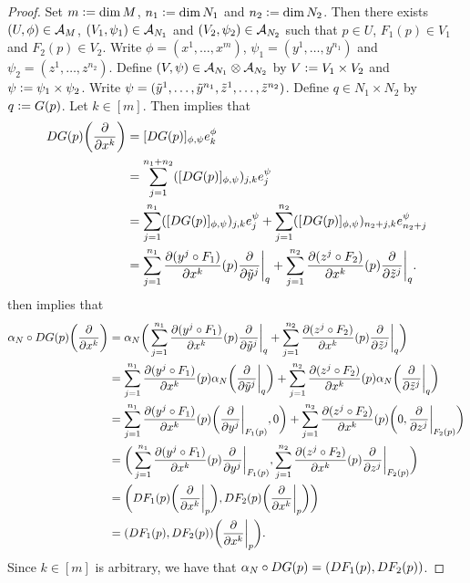 \documentclass{book}
\begin{document}
	\begin{proof}
		Set $m \vcentcolon= \dim M$, $n_1 \vcentcolon= \dim N_1$ and $n_2 \vcentcolon= \dim N_2$. Then there exists $(U, \phi) \in \mathcal{A}_M$, $(V_1, \psi_1) \in \mathcal{A}_{N_1}$ and $(V_2, \psi_2) \in \mathcal{A}_{N_2}$ such that $p \in U$, $F_1(p) \in V_1$ and $F_2(p) \in V_2$. Write $\phi = (x^1, \ldots, x^m)$, $\psi_1 = (y^1, \ldots, y^{n_1})$ and $\psi_2 = (z^1, \ldots, z^{n_2})$. Define $(V, \psi) \in \mathcal{A}_{N_1} \otimes \mathcal{A}_{N_2}$ by $V \vcentcolon= V_1 \times V_2$ and $\psi \vcentcolon= \psi_1 \times \psi_2$. Write $\psi = (\tilde{y}^1, \ldots, \tilde{y}^{n_1}, \tilde{z}^1, \ldots, \tilde{z}^{n_2})$. Define $q \in N_1 \times N_2$ by $q \vcentcolon= G(p)$. Let $k \in [m]$. Then  implies that
		\begin{align*}
			DG(p) \bigg( \frac{\partial}{\partial x^k} \bigg)
			& = [DG(p)]_{\phi, \psi} e^{\phi}_k \\
			& = \sum_{j=1}^{n_1 + n_2} ([DG(p)]_{\phi, \psi})_{j, k}  e^{\psi}_j \\
			& = \sum_{j=1}^{n_1} ([DG(p)]_{\phi, \psi})_{j, k}  e^{\psi}_j + \sum_{j=1}^{n_2} ([DG(p)]_{\phi, \psi})_{n_2 + j, k}  e^{\psi}_{n_2 + j} \\
			& = \sum_{j=1}^{n_1} \frac{\partial (y^j \circ F_1)}{\partial x^k}(p) \frac{\partial}{\partial \tilde{y}^j} \bigg|_q + \sum_{j=1}^{n_2} \frac{\partial (z^j \circ F_2)}{\partial x^k}(p) \frac{\partial}{\partial \tilde{z}^j} \bigg|_q.
		\end{align*}
		 then implies that 
		\begin{align*}
			\alpha_N \circ DG(p) \bigg( \frac{\partial}{\partial x^k} \bigg)
			& = \alpha_N \bigg( \sum_{j=1}^{n_1} \frac{\partial (y^j \circ F_1)}{\partial x^k}(p) \frac{\partial}{\partial \tilde{y}^j} \bigg|_q + \sum_{j=1}^{n_2} \frac{\partial (z^j \circ F_2)}{\partial x^k}(p) \frac{\partial}{\partial \tilde{z}^j} \bigg|_q \bigg) \\
			& = \sum_{j=1}^{n_1} \frac{\partial (y^j \circ F_1)}{\partial x^k}(p) \alpha_N \bigg( \frac{\partial}{\partial \tilde{y}^j} \bigg|_q \bigg) + \sum_{j=1}^{n_2} \frac{\partial (z^j \circ F_2)}{\partial x^k}(p) \alpha_N \bigg( \frac{\partial}{\partial \tilde{z}^j} \bigg|_q \bigg) \\
			& = \sum_{j=1}^{n_1} \frac{\partial (y^j \circ F_1)}{\partial x^k}(p) \bigg( \frac{\partial}{\partial y^j} \bigg|_{F_1(p)}, 0 \bigg) + \sum_{j=1}^{n_2} \frac{\partial (z^j \circ F_2)}{\partial x^k}(p) \bigg( 0, \frac{\partial}{\partial z^j} \bigg|_{F_2(p)} \bigg) \\
			& = \bigg( \sum_{j=1}^{n_1} \frac{\partial (y^j \circ F_1)}{\partial x^k}(p) \frac{\partial}{\partial y^j} \bigg|_{F_1(p)},  \sum_{j=1}^{n_2} \frac{\partial (z^j \circ F_2)}{\partial x^k}(p) \frac{\partial}{\partial z^j} \bigg|_{F_2(p)} \bigg) \\
			& = \bigg( DF_1(p) \bigg( \frac{\partial}{\partial x^k} \bigg|_p \bigg), DF_2(p) \bigg( \frac{\partial}{\partial x^k} \bigg|_p \bigg) \bigg) \\
			& = (DF_1(p), DF_2(p)) \bigg( \frac{\partial}{\partial x^k} \bigg|_p \bigg). 
		\end{align*}
		Since $k \in [m]$ is arbitrary, we have that $\alpha_N \circ DG(p) = (DF_1(p), DF_2(p))$. 
	\end{proof}
\end{document}
